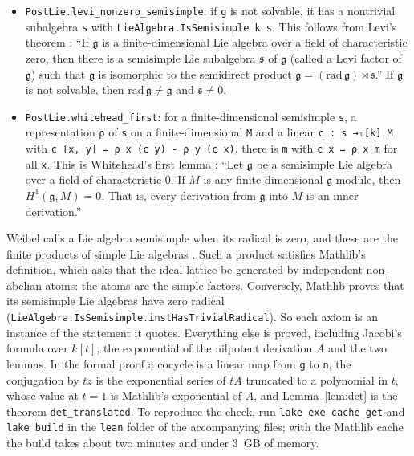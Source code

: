 \documentclass[11pt]{article}
\theoremstyle{definition}
\theoremstyle{remark}
\newcommand{\g}{\mathfrak{g}}
\newcommand{\s}{\mathfrak{s}}
\begin{document}
\begin{itemize}
\item \texttt{PostLie.levi\_nonzero\_semisimple}: if \texttt{g} is not
solvable, it has a nontrivial subalgebra \texttt{s} with
\texttt{LieAlgebra.IsSemisimple k s}. This follows from Levi's theorem
\cite[Theorem 7.8.13]{We}: ``If $\g$ is a finite-dimensional Lie algebra
over a field of characteristic zero, then there is a semisimple Lie
subalgebra $\s$ of $\g$ (called a Levi factor of $\g$) such that $\g$ is
isomorphic to the semidirect product $\g=(\mathrm{rad}\,\g)\rtimes\s$.'' If
$\g$ is not solvable, then $\mathrm{rad}\,\g\ne\g$ and $\s\ne0$.
\item \texttt{PostLie.whitehead\_first}: for a finite-dimensional
semisimple \texttt{s}, a representation \texttt{ρ} of \texttt{s} on a
finite-dimensional \texttt{M} and a linear \texttt{c : s →ₗ[k] M} with
\texttt{c ⁅x, y⁆ = ρ x (c y) - ρ y (c x)}, there is \texttt{m} with
\texttt{c x = ρ x m} for all \texttt{x}. This is Whitehead's first lemma
\cite[Corollary 7.8.10]{We}: ``Let $\g$ be a semisimple Lie algebra over a
field of characteristic 0. If $M$ is any finite-dimensional $\g$-module,
then $H^1(\g,M)=0$. That is, every derivation from $\g$ into $M$ is an
inner derivation.''
\end{itemize}
Weibel calls a Lie algebra semisimple when its radical is zero, and these
are the finite products of simple Lie algebras \cite[Theorem 7.8.5]{We}.
Such a product satisfies Mathlib's definition, which asks that the ideal
lattice be generated by independent non-abelian atoms: the atoms are the
simple factors. Conversely, Mathlib proves that its semisimple Lie
algebras have zero radical
(\texttt{LieAlgebra.IsSemisimple.instHasTrivialRadical}). So each axiom is
an instance of the statement it quotes.
Everything else is proved, including Jacobi's formula over $k[t]$, the
exponential of the nilpotent derivation $A$ and the two lemmas. In the
formal proof a cocycle is a linear map from \texttt{g} to \texttt{n}, the
conjugation by $tz$ is the exponential series of $tA$ truncated to a
polynomial in $t$, whose value at $t=1$ is Mathlib's exponential of $A$,
and Lemma~\ref{lem:det} is the theorem \texttt{det\_translated}. To
reproduce the check, run \texttt{lake exe cache get} and \texttt{lake
build} in the \texttt{lean} folder of the accompanying files; with the
Mathlib cache the build takes about two minutes and under 3~GB of
memory.
\end{document}
